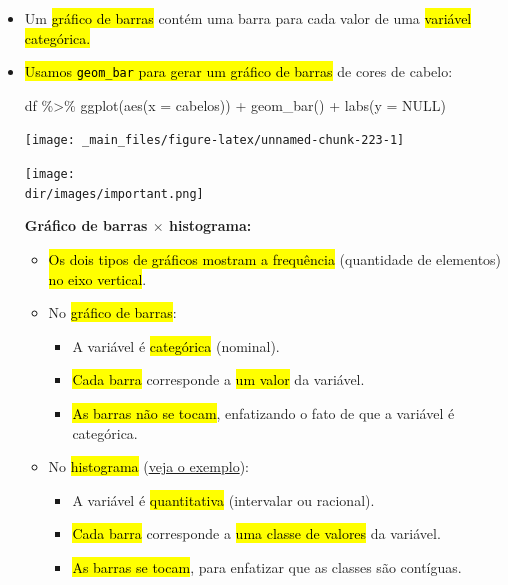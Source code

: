 \documentclass[
  11pt]{report}
\newenvironment{Shaded}{\begin{snugshade}}{\end{snugshade}}
\newcommand{\AttributeTok}[1]{\textcolor[rgb]{0.77,0.63,0.00}{#1}}
\newcommand{\ConstantTok}[1]{\textcolor[rgb]{0.00,0.00,0.00}{#1}}
\newcommand{\FunctionTok}[1]{\textcolor[rgb]{0.00,0.00,0.00}{#1}}
\newcommand{\NormalTok}[1]{#1}
\newcommand{\SpecialCharTok}[1]{\textcolor[rgb]{0.00,0.00,0.00}{#1}}
\newcommand{\dir}{/ssd/R/x86_64-pc-linux-gnu-library/4.2/fnaufelRmd/rmarkdown/resources}
\newenvironment{rmdimportant}
{
  \begin{myimportant}
    \texttt{[image: \\dir/images/important.png]}
    \tcblower
  }
  {
  \end{myimportant}
}
\renewenvironment{Shaded}{
    \begin{mdframed}[%
      roundcorner=2pt,%
      innerleftmargin=5pt,%
      innerrightmargin=5pt,%
      topline=true,%
      leftline=true,%
      rightline=true,%
      bottomline=true,%
      linewidth=0.5pt,%
      linecolor=black!20,%
      backgroundcolor=black!2,%
      skipabove=2ex,%
      skipbelow=2.5ex%
    ]%
  }
  {
    \end{mdframed}
  }
\begin{document}
\begin{itemize}
\item
  Um {\hl{gráfico de barras}} contém uma barra para cada valor de uma {\hl{variável categórica.}}
\item
  {\hl{Usamos {\mbox{\texttt{geom\_bar}}} para gerar um gráfico de barras}} de cores de cabelo:

\begin{Shaded}
\begin{Highlighting}[]
\NormalTok{df }\SpecialCharTok{\%\textgreater{}\%} 
  \FunctionTok{ggplot}\NormalTok{(}\FunctionTok{aes}\NormalTok{(}\AttributeTok{x =}\NormalTok{ cabelos)) }\SpecialCharTok{+}
    \FunctionTok{geom\_bar}\NormalTok{() }\SpecialCharTok{+}
    \FunctionTok{labs}\NormalTok{(}\AttributeTok{y =} \ConstantTok{NULL}\NormalTok{)}
\end{Highlighting}
\end{Shaded}

  \begin{center}\texttt{[image: \_main\_files/figure-latex/unnamed-chunk-223-1]} \end{center}

  \begin{rmdimportant}

  \textbf{Gráfico de barras $\times$ histograma:}

  \begin{itemize}
  \item
    {\hl{Os dois tipos de gráficos mostram a frequência}} (quantidade de elementos) {\hl{no eixo vertical}}.
  \item
    No {\hl{gráfico de barras}}:

    \begin{itemize}
    \item
      A variável é {\hl{categórica}} (nominal).
    \item
      {\hl{Cada barra}} corresponde a {\hl{um valor}} da variável.
    \item
      {\hl{As barras não se tocam}}, enfatizando o fato de que a variável é categórica.
    \end{itemize}
  \item
    No {\hl{histograma}} (\protect\hyperlink{histograma1}{veja o exemplo}):

    \begin{itemize}
    \item
      A variável é {\hl{quantitativa}} (intervalar ou racional).
    \item
      {\hl{Cada barra}} corresponde a {\hl{uma classe de valores}} da variável.
    \item
      {\hl{As barras se tocam}}, para enfatizar que as classes são contíguas.
    \end{itemize}
  \end{itemize}


\end{rmdimportant}
\end{itemize}
\end{document}
